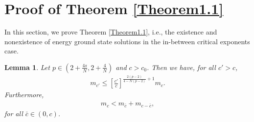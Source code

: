 \documentclass[12pt,a4paper,reqno]{amsart}
\numberwithin{equation}{section}
\newtheorem{lemma}{Lemma}[section]
\begin{document}
\section{Proof of Theorem \ref{Theorem1.1}}
In this section,
we prove Theorem \ref{Theorem1.1},
i.e.,
the existence and nonexistence of energy ground state solutions in the in-between critical exponents case.
\begin{lemma}\label{Lemma3.1}
Let $p\in(2+\frac{4s}{N},2+\frac{4}{N})$ and $c>c_{0}$.
Then we have, for all $c'>c$,
\begin{equation*}
\begin{aligned}
m_{c'}\leqslant \left[\frac{c'}{c}\right]^{\frac{2(p-2)}{4-N(p-2)}+1} m_{c}.
\end{aligned}
\end{equation*}
Furthermore,
\begin{equation*}
\begin{aligned}
m_{c}<m_{\bar{c}}+m_{c-\bar{c}},
\end{aligned}
\end{equation*}
for all $\bar{c}\in(0,c)$.
\end{lemma}
\end{document}
